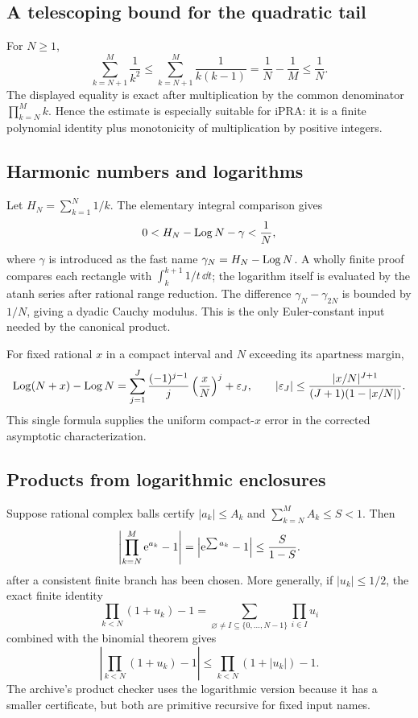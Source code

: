 \subsection{A telescoping bound for the quadratic tail}

For \(N\ge1\),
\begin{equation}\label{eq:pseries-tail}
  \sum_{k=N+1}^{M}\frac1{k^2}
  \le \sum_{k=N+1}^{M}\frac1{k(k-1)}
  =\frac1N-\frac1M
  \le\frac1N.
\end{equation}
The displayed equality is exact after multiplication by the common denominator
\(\prod_{k=N}^{M}k\).  Hence the estimate is especially suitable for iPRA: it
is a finite polynomial identity plus monotonicity of multiplication by positive
integers.

\subsection{Harmonic numbers and logarithms}

Let \(H_N=\sum_{k=1}^{N}1/k\).  The elementary integral comparison gives
\begin{equation}\label{eq:harmonic-log}
  0<H_N-\operatorname{Log} N-\gamma<\frac1N,
\end{equation}
where \(\gamma\) is introduced as the fast name
\(\gamma_N=H_N-\operatorname{Log} N\).  A wholly finite proof compares each rectangle with
\(\int_k^{k+1}1/t\,\dd t\); the logarithm itself is evaluated by the atanh
series after rational range reduction.  The difference
\(\gamma_N-\gamma_{2N}\) is bounded by \(1/N\), giving a dyadic Cauchy modulus.
This is the only Euler-constant input needed by the canonical product.

For fixed rational \(x\) in a compact interval and \(N\) exceeding its
apartness margin,
\begin{equation}\label{eq:log-shift}
 \operatorname{Log}(N+x)-\operatorname{Log} N
 =\sum_{j=1}^{J}\frac{(-1)^{j-1}}{j}\left(\frac{x}{N}\right)^j
  +\varepsilon_J,
 \qquad
 |\varepsilon_J|
 \le\frac{|x/N|^{J+1}}{(J+1)(1-|x/N|)}.
\end{equation}
This single formula supplies the uniform compact-\(x\) error in the corrected
asymptotic characterization.

\subsection{Products from logarithmic enclosures}

Suppose rational complex balls certify
\(|a_k|\le A_k\) and \(\sum_{k=N}^{M}A_k\le S<1\).  Then
\[
  \left|\prod_{k=N}^{M}\mathrm e^{a_k}-1\right|
  =\left|\mathrm e^{\sum a_k}-1\right|
  \le\frac{S}{1-S}.
\]
after a consistent finite branch has been chosen.  More generally, if
\(|u_k|\le1/2\), the exact finite identity
\[
 \prod_{k<N}(1+u_k)-1
 =\sum_{\varnothing\ne I\subseteq\{0,\ldots,N-1\}}
   \prod_{i\in I}u_i
\]
combined with the binomial theorem gives
\[
  \left|\prod_{k<N}(1+u_k)-1\right|
  \le \prod_{k<N}(1+|u_k|)-1.
\]
The archive's product checker uses the logarithmic version because it has a
smaller certificate, but both are primitive recursive for fixed input names.

